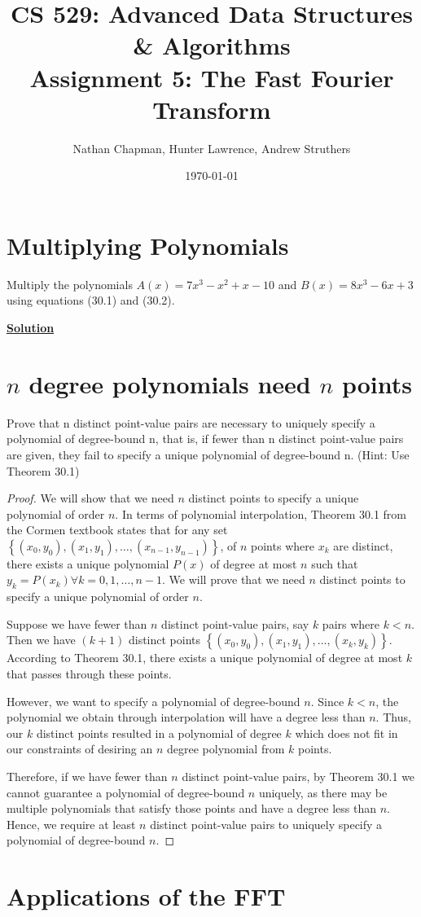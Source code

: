\documentclass{article}
\title{\vspace*{-0.625in}CS 529: Advanced Data Structures \& Algorithms \\ Assignment 5: The Fast Fourier Transform}
\author{Nathan Chapman, Hunter Lawrence, Andrew Struthers}
\date{\today}
\renewcommand{\_}{\ifincsname_\else\legacyunderscore\fi}
\begin{document}
    \maketitle

    \section*{Multiplying Polynomials}

        Multiply the polynomials $A(x) = 7 x^3 - x^2 + x - 10$ and $B(x) = 8x^3 - 6x + 3$ using equations (30.1) and (30.2).

        \underline{\textbf{Solution}}

        
        


    \section*{$n$ degree polynomials need $n$ points}

        Prove that n distinct point-value pairs are necessary to uniquely specify a polynomial of degree-bound n, that is, if fewer than n distinct point-value pairs are given, they fail to specify a unique polynomial of degree-bound n. (Hint: Use Theorem 30.1)

\begin{proof}
We will show that we need $n$ distinct points to specify a unique polynomial of order $n$. In terms of polynomial interpolation, Theorem 30.1 from the Cormen textbook states that for any set $\left\{ (x_0, y_0), (x_1, y_1), \hdots,(x_{n-1}, y_{n-1})\right\}$, of $n$ points where $x_k$ are distinct, there exists a unique polynomial $P(x)$ of degree at most $n$ such that $y_k=P(x_k) \forall k=0, 1, \hdots, n-1$. We will prove that we need $n$ distinct points to specify a unique polynomial of order $n$.

Suppose we have fewer than $n$ distinct point-value pairs, say $k$ pairs where $k < n$. Then we have $(k+1)$ distinct points $\left\{(x_0, y_0), (x_1, y_1), \hdots, (x_k, y_k)\right\}$. According to Theorem 30.1, there exists a unique polynomial of degree at most $k$ that passes through these points.

However, we want to specify a polynomial of degree-bound $n$. Since $k < n$, the polynomial we obtain through interpolation will have a degree less than $n$. Thus, our $k$ distinct points resulted in a polynomial of degree $k$ which does not fit in our constraints of desiring an $n$ degree polynomial from $k$ points. 

Therefore, if we have fewer than $n$ distinct point-value pairs, by Theorem 30.1 we cannot guarantee a polynomial of degree-bound $n$ uniquely, as there may be multiple polynomials that satisfy those points and have a degree less than $n$. Hence, we require at least $n$ distinct point-value pairs to uniquely specify a polynomial of degree-bound $n$.
\end{proof}

    \section*{Applications of the FFT}

\printbibliography
\end{document}

